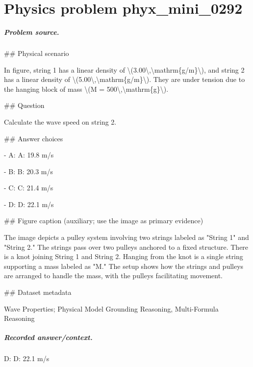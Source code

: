 
\chapter{Physics problem phyx\_mini\_0292}
\label{ch:PhyXMiniProblems_problem_phyx_mini_0292}

\paragraph{Problem source.}
\#\# Physical scenario

In figure, string 1 has a linear density of \textbackslash{}(3.00\textbackslash{},\textbackslash{}mathrm\{g/m\}\textbackslash{}), and string 2 has a linear density of \textbackslash{}(5.00\textbackslash{},\textbackslash{}mathrm\{g/m\}\textbackslash{}). They are under tension due to the hanging block of mass \textbackslash{}(M = 500\textbackslash{},\textbackslash{}mathrm\{g\}\textbackslash{}).

\#\# Question

Calculate the wave speed on string 2.

\#\# Answer choices

- A: A: 19.8 m/s

- B: B: 20.3 m/s

- C: C: 21.4 m/s

- D: D: 22.1 m/s

\#\# Figure caption (auxiliary; use the image as primary evidence)

The image depicts a pulley system involving two strings labeled as "String 1" and "String 2." The strings pass over two pulleys anchored to a fixed structure. There is a knot joining String 1 and String 2. Hanging from the knot is a single string supporting a mass labeled as "M." The setup shows how the strings and pulleys are arranged to handle the mass, with the pulleys facilitating movement.

\#\# Dataset metadata

Wave Properties; Physical Model Grounding Reasoning, Multi-Formula Reasoning

\paragraph{Recorded answer/context.}
D: D: 22.1 m/s

